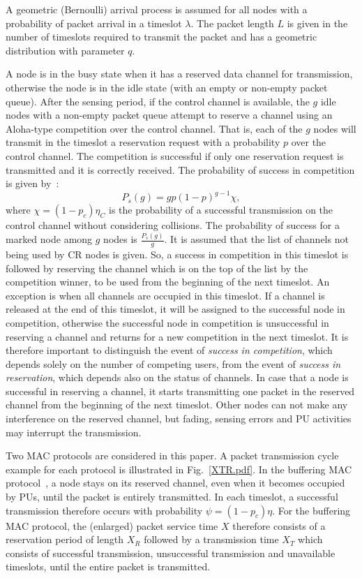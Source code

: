 \documentclass[12pt,journal,oneside,onecolumn]{IEEEtran}
\begin{document}
A geometric (Bernoulli) arrival process is assumed for all nodes with a probability of packet arrival in a timeslot $\lambda$. The packet length $L$ is given in the number of timeslots required to transmit the packet and has a geometric distribution with parameter $q$.

A node is in the busy state when it has a reserved data channel for transmission, otherwise the node is in the idle state (with an empty or non-empty packet queue). After the sensing period, if the control channel is available, the $g$ idle nodes with a non-empty packet queue attempt to reserve a channel using an Aloha-type competition over the control channel. That is, each of the $g$ nodes will transmit in the timeslot a reservation request with a probability $p$ over the control channel. The competition is successful if only one reservation request is transmitted and it is correctly received.
The probability of success in competition is given by~\cite{pawelczak09}:
\begin{equation}
P_s(g) =  g p (1-p)^{g-1} \chi,
\label{eq:Prob-Success}
\end{equation}
where $\chi=(1-p_c)\eta_C$ is the probability of a successful transmission on the control channel without considering collisions. The probability of success for a marked node among $g$ nodes is $\frac{P_s(g)}{g}$. 
It is assumed that the list of channels not being used by  CR nodes is given. So, a success in competition in this timeslot is followed by reserving the channel which is on the top of the list by the competition winner, to be used from the beginning of the next timeslot. An exception is when all channels are occupied in this timeslot. If a channel is released at the end of this timeslot, it will be assigned to the successful node in competition, otherwise the successful node in competition is unsuccessful in reserving a channel and returns for a new competition in the next timeslot. It is therefore important to distinguish the event of \emph{success in competition}, which depends solely on the number of competing users, from the event of \emph{success in reservation}, which depends also on the status of channels.
In case that a node is successful in reserving a channel, it starts transmitting one packet in the reserved channel from the beginning of the next timeslot. Other nodes can not make any interference on the reserved channel, but fading, sensing errors and PU activities may interrupt the transmission.

Two MAC protocols are considered in this paper. A  packet transmission cycle example for each protocol is illustrated in Fig.~\ref{XTR.pdf}. In the buffering MAC protocol~\cite{pawelczak09}, 
a node stays on its reserved channel, even when it becomes occupied by PUs, until the packet is entirely transmitted. 
In each timeslot, a successful transmission therefore occurs with probability $\psi=(1-p_c)\eta$. 
For the buffering MAC protocol, the (enlarged) packet service time $X$ therefore consists of a reservation period of length $X_R$ 
followed by a transmission time $X_T$ which consists of successful transmission, 
unsuccessful transmission and unavailable timeslots, until the entire packet is transmitted.
\end{document}
